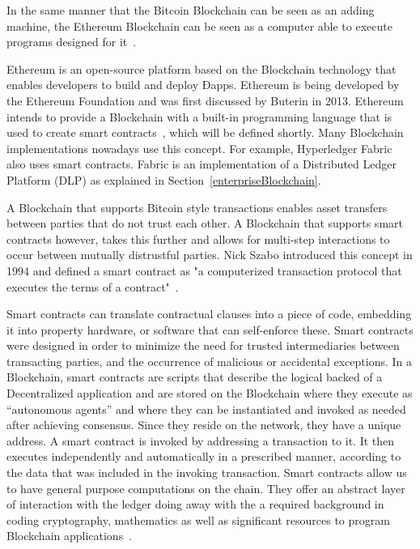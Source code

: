 In the same manner that the Bitcoin Blockchain can be seen as an adding
machine, the Ethereum Blockchain can be seen as a computer able to execute
programs designed for it~\cite{Wood2015}.

Ethereum is an open-source platform based on the Blockchain technology that
enables developers to build and deploy Ðapps. Ethereum is being developed by
the Ethereum Foundation and was first discussed by Buterin in 2013. Ethereum
intends to provide a Blockchain with a built-in programming language that is
used to create smart contracts~\cite{Wood2017}, which will be defined shortly.
Many Blockchain implementations nowadays use this concept. For example,
Hyperledger Fabric also uses smart contracts. Fabric is an implementation of a
Distributed Ledger Platform (DLP) as explained in
Section~\ref{enterpriseBlockchain}.

A Blockchain that supports Bitcoin style transactions enables asset transfers
between parties that do not trust each other. A Blockchain that supports smart
contracts however, takes this further and allows for multi-step interactions to
occur between mutually distrustful parties. Nick Szabo introduced this concept
in 1994 and defined a smart contract as "a computerized transaction protocol
that executes the terms of a contract"~\cite{Christidis2016}. 

Smart contracts can translate contractual clauses into a piece of code,
embedding it into property hardware, or software that can self-enforce these.
Smart contracts were designed in order to minimize the need for trusted
intermediaries between transacting parties, and the occurrence of malicious or
accidental exceptions. In a Blockchain, smart contracts are scripts that
describe the logical backed of a Decentralized application and are stored on
the Blockchain where they execute as “autonomous agents” and where they can be
instantiated and invoked as needed after achieving consensus.  Since they
reside on the network, they have a unique address. A smart contract is invoked
by addressing a transaction to it.  It then executes independently and
automatically in a prescribed manner, according to the data that was included
in the invoking transaction. Smart contracts allow us to have general purpose
computations on the chain.  They offer an abstract layer of interaction with
the ledger doing away with the a required background in coding cryptography,
mathematics as well as significant resources to program Blockchain
applications~\cite{Wood2017,BlockGeeks2017}.

